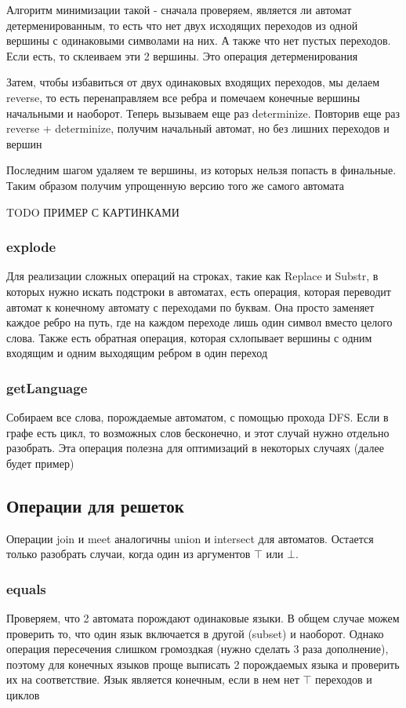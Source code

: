 Алгоритм минимизации такой - сначала проверяем, является ли автомат детерменированным, то есть что нет двух исходящих переходов из одной вершины с одинаковыми символами на них. А также что нет пустых переходов. Если есть, то склеиваем эти 2 вершины. Это операция детерменирования

Затем, чтобы избавиться от двух одинаковых входящих переходов, мы делаем reverse, то есть перенаправляем все ребра и помечаем конечные вершины начальными и наоборот. Теперь вызываем еще раз determinize. Повторив еще раз reverse + determinize, получим начальный автомат, но без лишних переходов и вершин

Последним шагом удаляем те вершины, из которых нельзя попасть в финальные. Таким образом получим упрощенную версию того же самого автомата

TODO ПРИМЕР С КАРТИНКАМИ

\subsubsection*{explode}
Для реализации сложных операций на строках, такие как Replace и Substr, в которых нужно искать подстроки в автоматах, есть операция, которая переводит автомат к конечному автомату с переходами по буквам. Она просто заменяет каждое ребро на путь, где на каждом переходе лишь один символ вместо целого слова. Также есть обратная операция, которая схлопывает вершины с одним входящим и одним выходящим ребром в один переход

\subsubsection*{getLanguage}
Собираем все слова, порождаемые автоматом, с помощью прохода DFS. Если в графе есть цикл, то возможных слов бесконечно, и этот случай нужно отдельно разобрать. Эта операция полезна для оптимизаций в некоторых случаях (далее будет пример)

\newpage
\subsection{Операции для решеток}
Операции join и meet аналогичны union и intersect для автоматов. Остается только разобрать случаи, когда один из аргументов $\top$ или $\bot$. 

\subsubsection*{equals}
Проверяем, что 2 автомата порождают одинаковые языки. В общем случае можем проверить то, что один язык включается в другой (subset) и наоборот. Однако операция пересечения слишком громоздкая (нужно сделать 3 раза дополнение), поэтому для конечных языков проще выписать 2 порождаемых языка и проверить их на соответствие. Язык является конечным, если в нем нет $\top$ переходов и циклов

